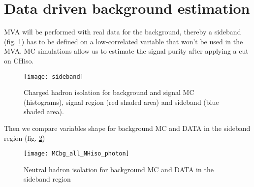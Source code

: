 \section{Data driven background estimation}

MVA will be performed with real data for the background, thereby a sideband (fig. \ref{sideband}) has to be defined on a low-correlated
variable that won't be used in the MVA. MC simulations allow us to estimate the signal purity after applying a cut on CHiso.

\begin{figure}[h!]
  \centering
  \texttt{[image: sideband]}\\[1cm]
  \caption{Charged hadron isolation for background and signal MC (histograms), signal region (red shaded area) and
  sideband (blue shaded area).}
  \label{sideband}
\end{figure}

Then we compare variables shape for background MC and DATA in the sideband region (fig. \ref{MCbg_all_NHiso_photon})

\begin{figure}[h!]
  \centering
  \texttt{[image: MCbg\_all\_NHiso\_photon]}\\[1cm]
  \caption{Neutral hadron isolation for background MC and DATA in the sideband region}
  \label{MCbg_all_NHiso_photon}
\end{figure}

